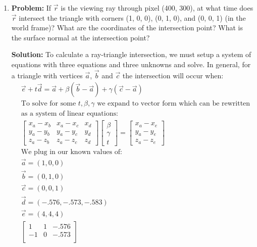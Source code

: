 \documentclass[a4paper, 12pt]{article}
\begin{document}
\begin{enumerate}
    \item \textbf{Problem:} If $\vec{r}$ is the viewing ray through pixel (400, 300), at what time does $\vec{r}$ intersect the triangle with corners (1, 0, 0), (0, 1, 0), and (0, 0, 1) (in the world frame)? What are the coordinates of the intersection point? What is the surface normal at the intersection point?

        \textbf{Solution:} To calculate a ray-triangle intersection, we must setup a system of equations with three equations and three unknowns and solve. In general, for a triangle with vertices $\vec{a}$, $\vec{b}$ and $\vec{c}$ the intersection will occur when:
    \begin{align*}
        &\vec{e} + t\vec{d} = \vec{a} + \beta(\vec{b} - \vec{a}) + \gamma(\vec{c} - \vec{a})\\
        &\text{To solve for some $t, \beta, \gamma$ we expand to vector form which can be rewritten}\\
        &\text{as a system of linear equations:}\\
        &\begin{bmatrix}
            x_a-x_b & x_a - x_c & x_d \\
            y_a-y_b & y_a - y_c & y_d \\
            z_a-z_b & z_a - z_c & z_d
        \end{bmatrix}
        \begin{bmatrix}
            \beta \\
            \gamma \\
            t
        \end{bmatrix}
        =
        \begin{bmatrix}
            x_a - x_e \\
            y_a - y_e \\
            z_a - z_e
        \end{bmatrix}\\
        &\text{We plug in our known values of:}\\
        &\vec{a} = (1,0,0)\\
        &\vec{b} = (0,1,0)\\
        &\vec{c} = (0,0,1)\\
        &\vec{d} = (-.576, -.573, -.583)\\
        &\vec{e} = (4,4,4)\\
        &\begin{bmatrix}
            1 & 1 & -.576 \\
            -1 & 0 & -.573 \\

\end{bmatrix}
\end{align*}
\end{enumerate}
\end{document}
